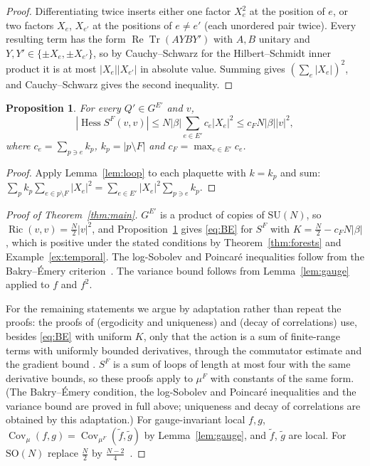 \documentclass[11pt]{amsart}
\newtheorem{proposition}[theorem]{Proposition}
\theoremstyle{definition}
\theoremstyle{remark}
\newcommand{\Tr}{\operatorname{Tr}}
\renewcommand{\Re}{\operatorname{Re}}
\newcommand{\Hess}{\operatorname{Hess}}
\newcommand{\Ric}{\operatorname{Ric}}
\newcommand{\SU}{\mathrm{SU}}
\newcommand{\SO}{\mathrm{SO}}
\begin{document}
\begin{proof}
Differentiating twice inserts either one factor $X_e^2$ at the position of $e$, or two factors $X_e$, $X_{e'}$ at the
positions of $e\neq e'$ (each unordered pair twice). Every resulting term has the form $\Re\Tr(A Y B Y')$ with
$A,B$ unitary and $Y,Y'\in\{\pm X_e,\pm X_{e'}\}$, so by Cauchy--Schwarz for the Hilbert--Schmidt inner product it is
at most $|X_e||X_{e'}|$ in absolute value. Summing gives $(\sum_e|X_e|)^2$, and Cauchy--Schwarz gives the second
inequality.
\end{proof}

\begin{proposition}\label{prop:hess}
For every $Q'\in G^{E'}$ and $v$,
\[|\Hess S^F(v,v)|\le N|\beta|\sum_{e\in E'}c_e|X_e|^2\le c_F N|\beta||v|^2,\]
where
$c_e=\sum_{p\ni e}k_p$, $k_p=|p\setminus F|$ and $c_F=\max_{e\in E'}c_e$.
\end{proposition}

\begin{proof}
Apply Lemma~\ref{lem:loop} to each plaquette with $k=k_p$ and sum:
$\sum_p k_p\sum_{e\in p\setminus F}|X_e|^2=\sum_{e\in E'}|X_e|^2\sum_{p\ni e}k_p$.
\end{proof}

\begin{proof}[Proof of Theorem~\ref{thm:main}]
$G^{E'}$ is a product of copies of $\SU(N)$, so $\Ric(v,v)=\frac{N}{2}|v|^2$, and Proposition~\ref{prop:hess} gives
\eqref{eq:BE} for $S^F$ with $K=\frac{N}{2}-c_FN|\beta|$, which is positive under the stated conditions by
Theorem~\ref{thm:forests} and Example~\ref{ex:temporal}. The log-Sobolev and Poincar\'e inequalities follow from the
Bakry--\'Emery criterion~\cite{BE}. The variance bound follows from Lemma~\ref{lem:gauge} applied to $f$ and $f^2$.

For the remaining statements we argue by adaptation rather than repeat the proofs: the proofs of \cite[Theorem~1.2]{SZZ} (ergodicity and uniqueness) and
\cite[Corollary~4.11]{SZZ} (decay of correlations) use, besides \eqref{eq:BE} with uniform $K$, only that the action
is a sum of finite-range terms with uniformly bounded derivatives, through the commutator estimate
\cite[Lemma~4.10]{SZZ} and the gradient bound \cite[Lemma~4.9]{SZZ}. $S^F$ is a sum of loops of length at most four
with the same derivative bounds, so these proofs apply to $\mu^F$ with constants of the same form. (The Bakry--\'Emery condition, the log-Sobolev and
Poincar\'e inequalities and the variance bound are proved in full above; uniqueness and decay of correlations are
obtained by this adaptation.) For gauge-invariant local $f,g$,
$\operatorname{Cov}_{\mu}(f,g)=\operatorname{Cov}_{\mu^F}(\tilde f,\tilde g)$ by Lemma~\ref{lem:gauge}, and $\tilde f$,
$\tilde g$ are local. For $\SO(N)$ replace $\frac{N}{2}$ by $\frac{N-2}{4}$~\cite{SZZ}.
\end{proof}
\end{document}
